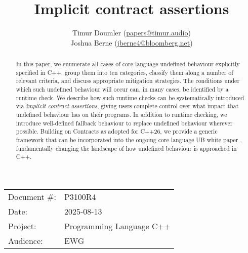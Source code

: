

\title{Implicit contract assertions}
\author{ Timur Doumler \small(\href{mailto:papers@timur.audio}{papers@timur.audio}) 
\\ Joshua Berne \small(\href{mailto:jberne4@bloomberg.net}{jberne4@bloomberg.net})  
}
\date{}
\maketitle

\begin{tabular}{ll}
Document \#: & P3100R4 \\
Date: &2025-08-13 \\
Project: & Programming Language C++ \\
Audience: & EWG
\end{tabular}

\begin{abstract}
In this paper, we enumerate all cases of core language undefined behaviour explicitly specified in C++,  group them into ten categories, classify them along a number of relevant criteria, and discuss appropriate mitigation strategies. The conditions under which such undefined behaviour will occur can, in many cases, be identified by a runtime check. We describe how such runtime checks can be systematically introduced via \emph{implicit contract assertions}, giving users complete control over what impact that undefined behaviour has on their programs. In addition to runtime checking, we introduce well-defined fallback behaviour to replace undefined behaviour wherever possible. Building on Contracts as adopted for C++26, we provide a generic framework that can be incorporated into the ongoing core language UB white paper \cite{P3656R1}, fundamentally changing the landscape of how undefined behaviour is approached in C++.
\end{abstract}


\tableofcontents*
\pagebreak




